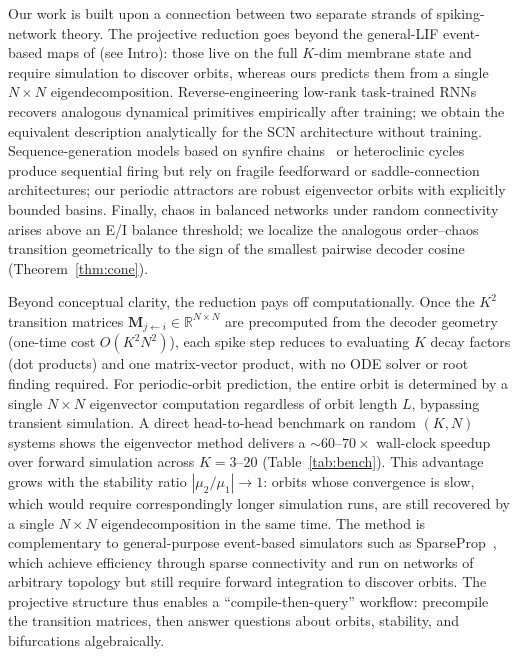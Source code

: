 \documentclass[12pt]{article}
\newcommand{\vv}[1]{\mathbf{#1}}
\newcommand{\RR}{\mathbb{R}}
\begin{document}
Our work is built upon a connection between two separate strands of spiking-network theory. The projective reduction goes beyond the general-LIF event-based maps of \citet{monteforte2010dynamical,engelken2013dynamical} (see Intro): those live on the full $K$-dim membrane state and require simulation to discover orbits, whereas ours predicts them from a single $N{\times}N$ eigendecomposition. Reverse-engineering low-rank task-trained RNNs~\citep{sussillo2013blackbox,maheswaranathan2019universality,driscoll2024flexible} recovers analogous dynamical primitives empirically after training; we obtain the equivalent description analytically for the SCN architecture without training. Sequence-generation models based on synfire chains~\citep{abeles1991corticonics} or heteroclinic cycles~\citep{rabinovich2008transient} produce sequential firing but rely on fragile feedforward or saddle-connection architectures; our periodic attractors are robust eigenvector orbits with explicitly bounded basins. Finally, chaos in balanced networks under random connectivity~\citep{vreeswijk1996chaos} arises above an E/I balance threshold; we localize the analogous order--chaos transition geometrically to the sign of the smallest pairwise decoder cosine (Theorem~\ref{thm:cone}).

Beyond conceptual clarity, the reduction pays off computationally. Once the $K^2$ transition matrices $\vv{M}_{j\leftarrow i}\in\RR^{N\times N}$ are precomputed from the decoder geometry (one-time cost $O(K^2 N^2)$), each spike step reduces to evaluating $K$ decay factors (dot products) and one matrix-vector product, with no ODE solver or root finding required. For periodic-orbit prediction, the entire orbit is determined by a single $N{\times}N$ eigenvector computation regardless of orbit length $L$, bypassing transient simulation. A direct head-to-head benchmark on random $(K,N)$ systems shows the eigenvector method delivers a ${\sim}60$--$70\times$ wall-clock speedup over forward simulation across $K=3$--$20$ (Table~\ref{tab:bench}). This advantage grows with the stability ratio $|\mu_2/\mu_1|\!\to\!1$: orbits whose convergence is slow, which would require correspondingly longer simulation runs, are still recovered by a single $N{\times}N$ eigendecomposition in the same time. The method is complementary to general-purpose event-based simulators such as SparseProp~\citep{engelken2023sparseprop}, which achieve efficiency through sparse connectivity and run on networks of arbitrary topology but still require forward integration to discover orbits. The projective structure thus enables a ``compile-then-query'' workflow: precompile the transition matrices, then answer questions about orbits, stability, and bifurcations algebraically.
\end{document}
